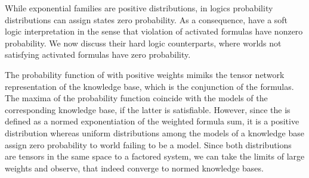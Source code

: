 

\sect{\HardLogicNetworks{}}\label{sec:hardNetworks} %

While exponential families are positive distributions, in logics probability distributions can assign states zero probability.
As a consequence, \MarkovLogicNetworks{} have a soft logic interpretation in the sense that violation of activated formulas have nonzero probability.
We now discuss their hard logic counterparts, where worlds not satisfying activated formulas have zero probability.


The probability function of \MarkovLogicNetworks{} with positive weights mimiks the tensor network representation of the knowledge base, which is the conjunction of the formulas.
The maxima of the probability function coincide with the models of the corresponding knowledge base, if the latter is satisfiable.
However, since the \MarkovLogicNetwork{} is defined as a normed exponentiation of the weighted formula sum, it is a positive distribution whereas uniform distributions among the models of a knowledge base assign zero probability to world failing to be a model.
Since both distributions are tensors in the same space to a factored system, we can take the limits of large weights and observe, that \MarkovLogicNetworks{} indeed converge to normed knowledge bases.

